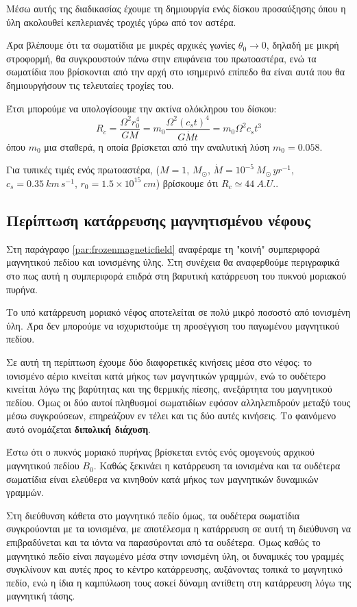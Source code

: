 \documentclass[a4paper,12pt]{memoir}
\newcommand{\e}[1]{\times 10^{#1}}
\begin{document}
Μέσω αυτής της διαδικασίας έχουμε τη δημιουργία ενός δίσκου προσαύξησης όπου η ύλη ακολουθεί κεπλεριανές τροχιές γύρω από τον αστέρα.

Άρα βλέπουμε ότι τα σωματίδια με μικρές αρχικές γωνίες $\theta _0 \to 0$, δηλαδή με μικρή στροφορμή, θα συγκρουστούν πάνω στην επιφάνεια του πρωτοαστέρα, ενώ τα σωματίδια που βρίσκονται από την αρχή στο ισημερινό επίπεδο θα είναι αυτά που θα δημιουργήσουν τις τελευταίες τροχίες του. 

Έτσι μπορούμε να υπολογίσουμε την ακτίνα ολόκληρου του δίσκου:
\begin{equation}
R_c=\frac{\Omega^2 r_0 ^4}{GM} = m_0 \frac{\Omega^2 (c_s t)^4}{G \dot{M} t} =m_0 \Omega ^2 c_s t^3
\end{equation}
όπου $m_0$ μια σταθερά, η οποία βρίσκεται από την αναλυτική λύση $m_0=0.058$. 

Για τυπικές τιμές ενός πρωτοαστέρα, ($M=1$, $M_{\odot}$, $\dot{M}=10^{-5} \ M_{\odot} \, yr^{-1}$, $c_s =0.35\ km\, s^{-1}$, $r_0 = 1.5 \e{15}\ cm$) βρίσκουμε ότι $R_c \simeq 44\ A.U.$.  

\subsection{Περίπτωση κατάρρευσης μαγνητισμένου νέφους}
Στη παράγραφο \ref{par:frozenmagneticfield} αναφέραμε τη "κοινή" συμπεριφορά μαγνητικού πεδίου και ιονισμένης ύλης. Στη συνέχεια θα αναφερθούμε περιγραφικά στο πως αυτή η συμπεριφορά επιδρά στη βαρυτική κατάρρευση του πυκνού μοριακού πυρήνα.

Το υπό κατάρρευση μοριακό νέφος αποτελείται σε πολύ μικρό ποσοστό από ιονισμένη ύλη. Άρα δεν μπορούμε να ισχυριστούμε τη προσέγγιση του παγωμένου μαγνητικού πεδίου. 

Σε αυτή τη περίπτωση έχουμε δύο διαφορετικές κινήσεις μέσα στο νέφος: το ιονισμένο αέριο κινείται κατά μήκος των μαγνητικών γραμμών, ενώ το ουδέτερο κινείται λόγω της βαρύτητας και της θερμικής πίεσης, ανεξάρτητα του μαγνητικού πεδίου.
Όμως οι δύο αυτοί πληθυσμοί σωματιδίων εφόσον αλληλεπιδρούν μεταξύ τους μέσω συγκρούσεων, επηρεάζουν εν τέλει και τις δύο αυτές κινήσεις. Το φαινόμενο αυτό ονομάζεται \textbf{διπολική διάχυση}.

Έστω ότι ο πυκνός μοριακό πυρήνας βρίσκεται εντός ενός ομογενούς αρχικού μαγνητικού πεδίου $B_0$. Καθώς ξεκινάει η κατάρρευση τα ιονισμένα και τα ουδέτερα σωματίδια είναι ελεύθερα να κινηθούν κατά μήκος των μαγνητικών δυναμικών γραμμών. 

Στη διεύθυνση κάθετα στο μαγνητικό πεδίο όμως, τα ουδέτερα σωματίδια συγκρούονται με τα ιονισμένα, με αποτέλεσμα η κατάρρευση σε αυτή τη διεύθυνση να επιβραδύνεται και τα ιόντα να παρασύρονται από τα ουδέτερα. Όμως καθώς το μαγνητικό πεδίο είναι παγωμένο μέσα στην ιονισμένη ύλη, οι δυναμικές του γραμμές συγκλίνουν και αυτές προς το κέντρο κατάρρευσης, αυξάνοντας τοπικά το μαγνητικό πεδίο, ενώ η ίδια η καμπύλωση τους ασκεί δύναμη αντίθετη στη κατάρρευση λόγω της μαγνητική τάσης. 
\end{document}
